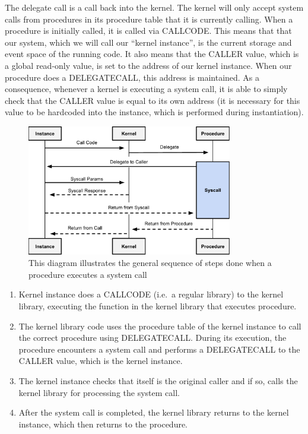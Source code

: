 \documentclass[english,a4paper]{article}
\begin{document}
The delegate call is a call back into the kernel. The kernel will only
accept system calls from procedures in its procedure table that it is
currently calling. When a procedure is initially called, it is called
via CALLCODE. This means that that our system, which we will call our
``kernel instance'', is the current storage and event space of the
running code. It also means that the CALLER value, which is a global
read-only value, is set to the address of our kernel instance. When our
procedure does a DELEGATECALL, this address is maintained. As a
consequence, whenever a kernel is executing a system call, it is able to
simply check that the CALLER value is equal to its own address (it is
necessary for this value to be hardcoded into the instance, which is
performed during instantiation).


\begin{figure}[htbp]
\centering
\includegraphics[width=0.8\textwidth]{media/SystemCalls.pdf}
\caption{This diagram illustrates the general sequence of steps
done when a procedure executes a system call}
\end{figure}

\begin{enumerate}
\def\labelenumi{\arabic{enumi}.}
\item
  Kernel instance does a CALLCODE (i.e.~a regular library) to the kernel
  library, executing the function in the kernel library that executes
  procedure.
\item
  The kernel library code uses the procedure table of the kernel
  instance to call the correct procedure using DELEGATECALL. During its
  execution, the procedure encounters a system call and performs a
  DELEGATECALL to the CALLER value, which is the kernel instance.
\item
  The kernel instance checks that itself is the original caller and if
  so, calls the kernel library for processing the system call.
\item
  After the system call is completed, the kernel library returns to the
  kernel instance, which then returns to the procedure.
\end{enumerate}
\end{document}

